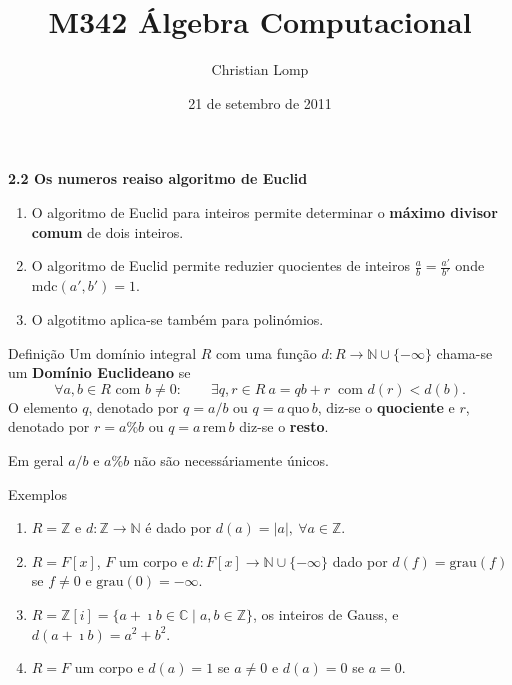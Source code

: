 \documentclass{beamer}
\title[M342]{M342 Álgebra Computacional}
\author{Christian Lomp}
\institute{FCUP}
\date{21 de setembro de 2011}
\newcommand{\ZZ}{\mathbb Z}
\newcommand{\NN}{\mathbb N}
\newcommand{\CC}{\mathbb C}
\newcommand{\grau}[1]{\mathrm{grau}({#1})}
\newcommand{\mdc}[2]{\mathrm{mdc}({#1}, {#2})}
\newcommand{\quo}[2]{{#1}\, \mathrm{quo} \, {#2}}
\newcommand{\rem}[2]{{#1}\, \mathrm{rem} \, {#2}}
\begin{document}
\begin{frame}
\titlepage
\end{frame}






\begin{frame}{\bf 2.2 Os numeros reais}{\bf {o algoritmo de Euclid}}
\begin{enumerate}
\item O algoritmo de Euclid para inteiros permite determinar o {\bf máximo divisor comum} de dois inteiros.\pause
\item O algoritmo de Euclid permite reduzier quocientes de inteiros $\frac{a}{b} = \frac{a'}{b'}$ onde $\mdc{a'}{b'}=1$.\pause
\item O algotitmo aplica-se também para polinómios.
\end{enumerate}
\end{frame}

\begin{frame}
\begin{block}{Definição} Um domínio integral $R$ com uma função $d:R\rightarrow \NN\cup\{-\infty\}$  chama-se um {\bf Domínio Euclideano} se 
$$\forall a,b \in R \mbox{ com } b\neq 0: \qquad \exists q,r \in R \: a=qb+r \:\mbox{ com } d(r)<d(b).$$
\pause
O elemento $q$, denotado por $q=a/b$ ou $q=\quo{a}{b}$, diz-se o {\bf quociente} e $r$, denotado por $r=a\%b$ ou $q=\rem{a}{b}$ diz-se o {\bf resto}. 

\pause Em geral $a/b$ e $a\%b$ não são necessáriamente únicos.
\end{block}
\end{frame}

\begin{frame}
\begin{block}{Exemplos}
\begin{enumerate}
\item $R=\ZZ$ e $d:\ZZ \rightarrow \NN$ é dado por $d(a)=|a|, \: \forall a\in \ZZ$.\pause
\item $R=F[x]$, $F$ um corpo e $d:F[x] \rightarrow \NN\cup \{-\infty\}$  dado por $d(f)=\grau{f}$ se $f\neq 0$ e $\grau{0}=-\infty$.\pause
\item $R=\ZZ[i] = \{a+\imath b\in\CC \mid a,b\in\ZZ\}$, os inteiros de Gauss, e $d(a+\imath b) = a^2+b^2$.\pause
\item $R=F$ um corpo e $d(a)=1$ se $a\neq 0$ e $d(a)=0$ se $a=0$.
\end{enumerate}
\end{block}
\end{frame}
\end{document}
